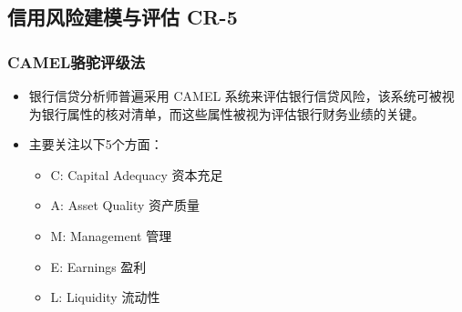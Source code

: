 \subsection{信用风险建模与评估 CR-5}


\subsubsection{CAMEL骆驼评级法}
\begin{itemize}
    \item 银行信贷分析师普遍采用 CAMEL 系统来评估银行信贷风险，该系统可被视为银行属性的核对清单，而这些属性被视为评估银行财务业绩的关键。
    \item 主要关注以下5个方面：
    \begin{itemize}
        \item C: Capital Adequacy 资本充足
        \item A: Asset Quality 资产质量
        \item M: Management 管理
        \item E: Earnings 盈利
        \item L: Liquidity 流动性
    \end{itemize}

\end{itemize}

